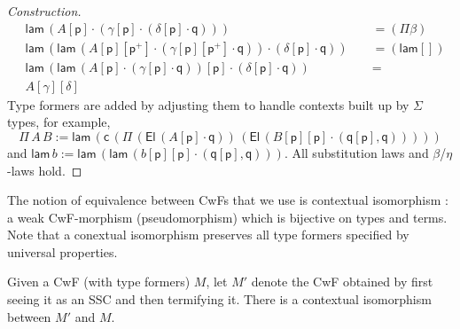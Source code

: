 \documentclass[sigplan,10pt,anonymous,review]{acmart}\settopmatter{printfolios=true,printccs=false,printacmref=false}
\newcommand{\p}{\mathsf{p}}
\newcommand{\q}{\mathsf{q}}
\newcommand{\lam}{\mathsf{lam}}
\newcommand{\El}{\mathsf{El}}
\newcommand{\cd}{\mathsf{c}}
\begin{document}
\begin{proof}[Construction]
\begin{equation}
\begin{alignedat}{10}
    & \lam\,(A[\p]\cdot(\gamma[\p]\cdot(\delta[\p]\cdot\q))) && {=}(\Pi\beta) \\
    & \lam\,(\lam\,(A[\p][\p^+]\cdot(\gamma[\p][\p^+]\cdot\q))\cdot(\delta[\p]\cdot\q))\,\, && {=}(\lam[]) \\
    & \lam\,(\lam\,(A[\p]\cdot(\gamma[\p]\cdot\q))[\p]\cdot(\delta[\p]\cdot\q)) && {=} \\
    & A[\gamma][\delta]
  \end{alignedat}
  \end{equation}
  Type formers are added by adjusting them to handle contexts built up
  by $\Sigma$ types, for example,
  \[
  \Pi\,A\,B := \lam\,(\cd\,(\Pi\,(\El\,(A[\p]\cdot\q))\,(\El\,(B[\p][\p]\cdot(\q[\p],\q)))))
  \]
  and $\lam\,b := \lam\,(\lam\,(b[\p][\p]\cdot(\q[\p],\q)))$. All
  substitution laws and $\beta$/$\eta$-laws hold.
\end{proof}
The notion of equivalence between CwFs that we use is contextual
isomorphism \cite{DBLP:journals/corr/abs-2211-07487}: a weak
CwF-morphism (pseudomorphism) which is bijective on types and
terms. Note that a conextual isomorphism preserves all type formers
specified by universal properties.
\begin{problem}
  Given a CwF (with type formers) $M$, let $M'$ denote the CwF
  obtained by first seeing it as an SSC and then termifying it. There
  is a contextual isomorphism between $M'$ and $M$.
\end{problem}
\end{document}
